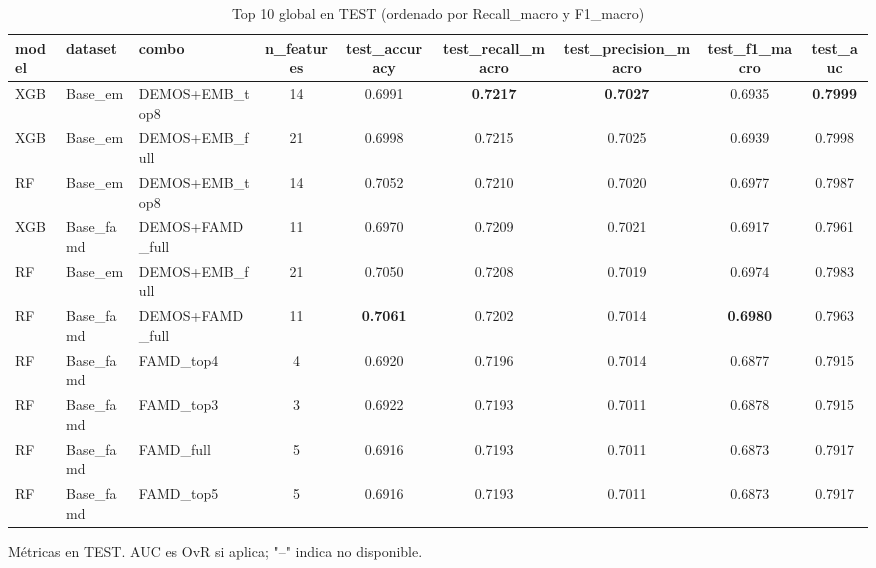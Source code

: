 
\begin{table}[ht]
\centering
\begin{threeparttable}
\caption{Top 10 global en TEST (ordenado por Recall\_macro y F1\_macro)}
\label{tab:global_top10}
\begin{tabular}{@{} l l l S S S S S S @{}}
\toprule
model & dataset & combo & n_features & test_accuracy & test_recall_macro & test_precision_macro & test_f1_macro & test_auc \\
\midrule
XGB & Base_em & DEMOS+EMB_top8 & 14 & 0.6991 & \textbf{0.7217} & \textbf{0.7027} & 0.6935 & \textbf{0.7999} \\
XGB & Base_em & DEMOS+EMB_full & 21 & 0.6998 & 0.7215 & 0.7025 & 0.6939 & 0.7998 \\
RF & Base_em & DEMOS+EMB_top8 & 14 & 0.7052 & 0.7210 & 0.7020 & 0.6977 & 0.7987 \\
XGB & Base_famd & DEMOS+FAMD_full & 11 & 0.6970 & 0.7209 & 0.7021 & 0.6917 & 0.7961 \\
RF & Base_em & DEMOS+EMB_full & 21 & 0.7050 & 0.7208 & 0.7019 & 0.6974 & 0.7983 \\
RF & Base_famd & DEMOS+FAMD_full & 11 & \textbf{0.7061} & 0.7202 & 0.7014 & \textbf{0.6980} & 0.7963 \\
RF & Base_famd & FAMD_top4 & 4 & 0.6920 & 0.7196 & 0.7014 & 0.6877 & 0.7915 \\
RF & Base_famd & FAMD_top3 & 3 & 0.6922 & 0.7193 & 0.7011 & 0.6878 & 0.7915 \\
RF & Base_famd & FAMD_full & 5 & 0.6916 & 0.7193 & 0.7011 & 0.6873 & 0.7917 \\
RF & Base_famd & FAMD_top5 & 5 & 0.6916 & 0.7193 & 0.7011 & 0.6873 & 0.7917 \\
\bottomrule
\end{tabular}

\begin{tablenotes}\footnotesize
\item Métricas en TEST. AUC es OvR si aplica; "--" indica no disponible.
\end{tablenotes}
\end{threeparttable}
\end{table}
